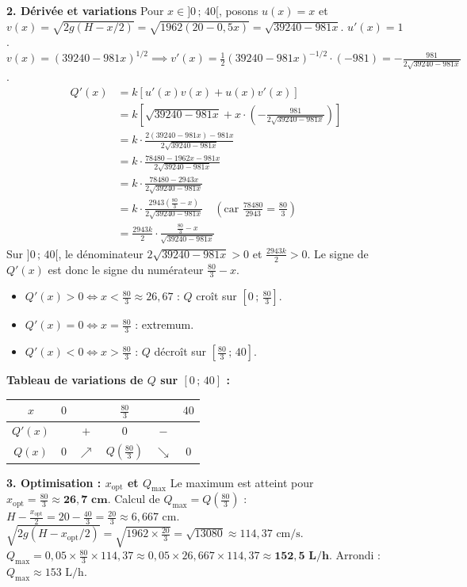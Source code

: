 \documentclass[11pt]{article}
\begin{document}
\begin{exoresolu}
\textbf{2. Dérivée et variations}
Pour $x \in ]0\,;\, 40[$, posons $u(x) = x$ et $v(x) = \sqrt{2g(H - x/2)} = \sqrt{1962(20 - 0,5x)} = \sqrt{39240 - 981x}$.
$u'(x) = 1$.
$v(x) = (39240 - 981x)^{1/2} \implies v'(x) = \frac{1}{2}(39240 - 981x)^{-1/2} \cdot (-981) = -\frac{981}{2\sqrt{39240 - 981x}}$.
\begin{align*}
Q'(x) &= k \left[ u'(x)v(x) + u(x)v'(x) \right] \\
&= k \left[ \sqrt{39240 - 981x} + x \cdot \left( -\frac{981}{2\sqrt{39240 - 981x}} \right) \right] \\
&= k \cdot \frac{2(39240 - 981x) - 981x}{2\sqrt{39240 - 981x}} \\
&= k \cdot \frac{78480 - 1962x - 981x}{2\sqrt{39240 - 981x}} \\
&= k \cdot \frac{78480 - 2943x}{2\sqrt{39240 - 981x}} \\
&= k \cdot \frac{2943\left(\frac{80}{3} - x\right)}{2\sqrt{39240 - 981x}} \quad \left(\text{car } \frac{78480}{2943} = \frac{80}{3}\right) \\
&= \frac{2943k}{2} \cdot \frac{\frac{80}{3} - x}{\sqrt{39240 - 981x}}
\end{align*}
Sur $]0\,;\, 40[$, le dénominateur $2\sqrt{39240 - 981x} > 0$ et $\frac{2943k}{2} > 0$.
Le signe de $Q'(x)$ est donc le signe du numérateur $\frac{80}{3} - x$.
\begin{itemize}
    \item $Q'(x) > 0 \iff x < \frac{80}{3} \approx 26,67$ : $Q$ croît sur $\left[0\,;\, \frac{80}{3}\right]$.
    \item $Q'(x) = 0 \iff x = \frac{80}{3}$ : extremum.
    \item $Q'(x) < 0 \iff x > \frac{80}{3}$ : $Q$ décroît sur $\left[\frac{80}{3}\,;\, 40\right]$.
\end{itemize}

\noindent \textbf{Tableau de variations de $Q$ sur $[0\,;\, 40]$ :}
\begin{center}
\begin{tabular}{|c|ccccc|}\hline
$x$ & $0$ & & $\frac{80}{3}$ & & $40$ \\ \hline
$Q'(x)$ & & $+$ & $0$ & $-$ & \\ \hline
$Q(x)$ & $0$ & $\nearrow$ & $Q(\frac{80}{3})$ & $\searrow$ & $0$ \\ \hline
\end{tabular}
\end{center}

\textbf{3. Optimisation : $x_{\text{opt}}$ et $Q_{\text{max}}$}
Le maximum est atteint pour $x_{\text{opt}} = \frac{80}{3} \approx \mathbf{26,7 \text{ cm}}$.
Calcul de $Q_{\text{max}} = Q\left(\frac{80}{3}\right)$ :
$H - \frac{x_{\text{opt}}}{2} = 20 - \frac{40}{3} = \frac{20}{3} \approx 6,667 \text{ cm}$.
$\sqrt{2g(H - x_{\text{opt}}/2)} = \sqrt{1962 \times \frac{20}{3}} = \sqrt{13080} \approx 114,37 \text{ cm/s}$.
$Q_{\text{max}} = 0,05 \times \frac{80}{3} \times 114,37 \approx 0,05 \times 26,667 \times 114,37 \approx \mathbf{152,5 \text{ L/h}}$.
Arrondi : \textbf{$Q_{\text{max}} \approx 153 \text{ L/h}$}.


\end{exoresolu}
\end{document}
